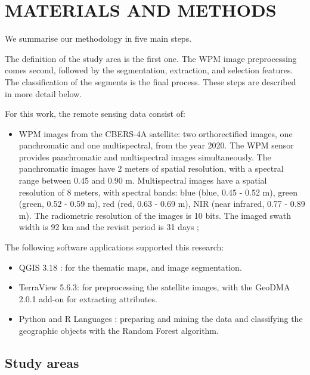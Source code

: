 \documentclass[preprint, 3p,
authoryear]{elsarticle} %
\providecommand{\tightlist}{%
  \setlength{\itemsep}{0pt}\setlength{\parskip}{0pt}}
\begin{document}
\hypertarget{materials-and-methods}{%
\section{MATERIALS AND METHODS}\label{materials-and-methods}}

We summarise our methodology in five main steps.

The definition of the study area is the first one. The WPM image
preprocessing comes second, followed by the segmentation, extraction,
and selection features. The classification of the segments is the final
process. These steps are described in more detail below.

For this work, the remote sensing data consist of:

\begin{itemize}
\tightlist
\item
  WPM images from the CBERS-4A satellite: two orthorectified images, one
  panchromatic and one multispectral, from the year 2020. The WPM sensor
  provides panchromatic and multispectral images simultaneously. The
  panchromatic images have 2 meters of spatial resolution, with a
  spectral range between 0.45 and 0.90 \textmu m. Multispectral images
  have a spatial resolution of 8 meters, with spectral bands: blue
  (blue, 0.45 - 0.52 \textmu m), green (green, 0.52 - 0.59 \textmu m),
  red (red, 0.63 - 0.69 \textmu m), NIR (near infrared, 0.77 - 0.89
  \textmu m). The radiometric resolution of the images is 10 bits. The
  imaged swath width is 92 km and the revisit period is 31 days
  \citep{INPE2019};
\end{itemize}

The following software applications supported this research:

\begin{itemize}
\item
  QGIS 3.18 \citep{QGISTeam2021}: for the thematic maps, and image
  segmentation.
\item
  TerraView 5.6.3: for preprocessing the satellite images, with the
  GeoDMA 2.0.1 add-on \citep{Korting2013} for extracting attributes.
\item
  Python \citep{vanRossum1995} and R Languages \citep{R2022} : preparing
  and mining the data and classifying the geographic objects with the
  Random Forest algorithm.
\end{itemize}

\hypertarget{study-areas}{%
\subsection{Study areas}\label{study-areas}}
\end{document}
